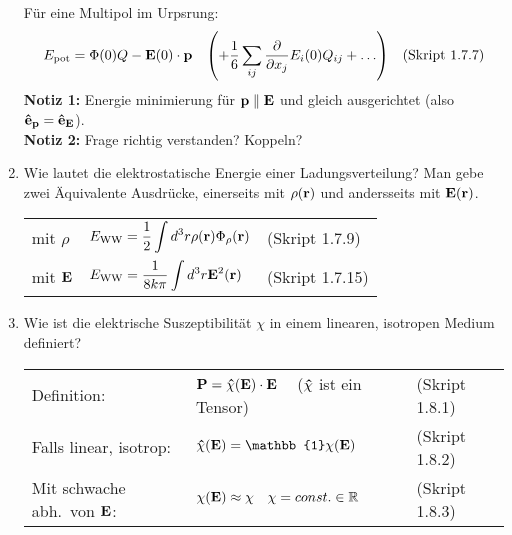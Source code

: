 \documentclass{scrartcl}
\newcommand{\ds}{\displaystyle}
\newcommand{\smref}[1]{\quad\text{(Skript #1)}}
\begin{document}
\begin{enumerate}
          Für eine Multipol im Urpsrung:
          $$E_{\text{pot}}=\Phi(0)Q-\vb E(0)\cdot\vb p 
          \quad\qty(+ \frac{1}{6}\sum_{ij}\pdv{x_j}E_i(0)Q_{ij}+\ldots)
          \smref{1.7.7}$$
          \textbf{Notiz 1:} Energie minimierung für $\vb p\parallel \vb E$
          und gleich ausgerichtet (also $\vu e_{\vb p}=\vu e_{\vb E}$).\\
          \textbf{Notiz 2:} Frage richtig verstanden? Koppeln?

    \item Wie lautet die elektrostatische Energie einer Ladungsverteilung?
          Man gebe zwei Äquivalente Ausdrücke, einerseits mit $\rho(\vb r)$
          und andersseits mit $\vb E(\vb r)$.
          \begin{center}
          \begin{tabular}{lll}
            mit $\rho$    & $\ds E_{\text{WW}}=
                            \frac{1}{2}\int d^3 r\rho(\vb r)
                            \Phi_\rho(\vb r)$
                              &(Skript 1.7.9)\\
            mit $\vb E$   & $\ds E_{\text{WW}}=\frac{1}{8k\pi}
                             \int d^3 r\vb E^2(\vb r)$
                              &(Skript 1.7.15)\\
          \end{tabular}
          \end{center}

    \clearpage
    \item Wie ist die elektrische Suszeptibilität $\chi$ in einem 
          linearen, isotropen Medium definiert?
          \begin{center}
          \begin{tabular}{lll}
            Definition:             & $\ds\vb P = 
                                      \vu \chi(\vb E)\cdot \vb E\quad$
                                      ($\vu\chi$ ist ein Tensor)
                                      & (Skript 1.8.1) \\
            Falls linear, isotrop: 
                                    & $\ds\vu\chi(\vb E)=
                                         \mathbb{1}\chi(\vb E)$
                                      & (Skript 1.8.2) \\
            Mit schwache abh.\ von $\vb E$:
                                    & $\chi(\vb E)\approx\chi
                                       \quad\chi=const.\in\mathbb{R}$
                                      & (Skript 1.8.3) \\
            

\end{tabular}
\end{center}
\end{enumerate}
\end{document}
